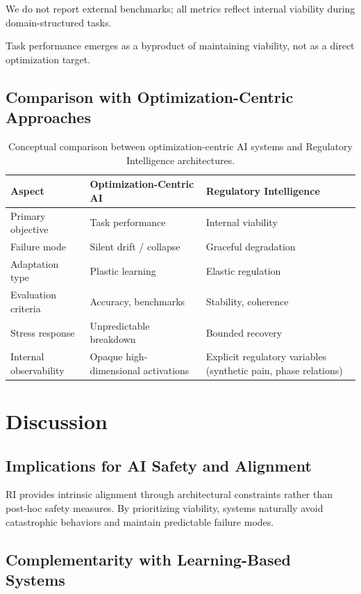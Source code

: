 \documentclass[12pt,a4paper]{report}
\begin{document}
We do not report external benchmarks; all metrics reflect internal viability during domain-structured tasks.

Task performance emerges as a byproduct of maintaining viability, not as a direct optimization target.

\subsection{Comparison with Optimization-Centric Approaches}

\begin{table}[H]
\centering
\caption{Conceptual comparison between optimization-centric AI systems and Regulatory Intelligence architectures.}
\begin{tabular}{l p{5cm} p{5cm}}
\toprule
\textbf{Aspect} & \textbf{Optimization-Centric AI} & \textbf{Regulatory Intelligence} \\
\midrule
Primary objective & Task performance & Internal viability \\
Failure mode & Silent drift / collapse & Graceful degradation \\
Adaptation type & Plastic learning & Elastic regulation \\
Evaluation criteria & Accuracy, benchmarks & Stability, coherence \\
Stress response & Unpredictable breakdown & Bounded recovery \\
Internal observability & Opaque high-dimensional activations & Explicit regulatory variables (synthetic pain, phase relations) \\
\bottomrule
\end{tabular}
\end{table}

\section{Discussion}

\subsection{Implications for AI Safety and Alignment}

RI provides intrinsic alignment through architectural constraints rather than post-hoc safety measures. By prioritizing viability, systems naturally avoid catastrophic behaviors and maintain predictable failure modes.

\subsection{Complementarity with Learning-Based Systems}
\end{document}

